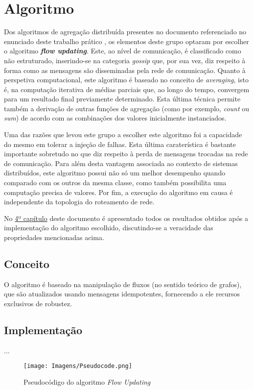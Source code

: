 \documentclass[a4paper]{article}
\begin{document}
\section{Algoritmo} \label{sec:Algorithm}
\large{
	Dos algoritmos de agregação distribuída presentes no documento referenciado no enunciado deste trabalho prático \parencite{article}, os elementos deste grupo optaram por escolher o algoritmo \textbf{\textit{flow updating}}.
	Este, ao nível de comunicação, é classificado como não estruturado, inserindo-se na categoria \textit{gossip} que, por sua vez, diz respeito à forma como as mensagens são disseminadas pela rede de comunicação.
	Quanto à perspetiva computacional, este algoritmo é baseado no conceito de \textit{averaging}, isto é, na computação iterativa de médias parciais que, ao longo do tempo, convergem para um resultado final previamente determinado.
	Esta última técnica permite também a derivação de outras funções de agregação (como por exemplo, \textit{count} ou \textit{sum}) de acordo com as combinações dos valores inicialmente instanciados.

	Uma das razões que levou este grupo a escolher este algoritmo foi a capacidade do mesmo em tolerar a injeção de falhas. Esta última caraterística é bastante importante sobretudo no que diz respeito à perda de mensagens trocadas na rede de comunicação.
	Para além desta vantagem associada ao contexto de sistemas distribuídos, este algoritmo possui não só um melhor desempenho quando comparado com os outros da mesma classe, como também possibilita uma computação precisa de valores.
	Por fim, a execução do algoritmo em causa é independente da topologia do roteamento de rede.

	No \hyperref[sec:Analysis of results]{4º capítulo} deste documento é apresentado todos os resultados obtidos após a implementação do algoritmo escolhido, discutindo-se a veracidade das propriedades mencionadas acima.

	\subsection{Conceito} \label{subsec:Concept}
	O algoritmo é baseado na manipulação de fluxos (no sentido teórico de grafos), que são atualizados usando mensagens idempotentes, fornecendo a ele recursos exclusivos de robustez.

	\subsection{Implementação} \label{subsec:Implementation}
	...

	\begin{figure}[H]
		\centering
		\texttt{[image: Imagens/Pseudocode.png]}
		\caption{Pseudocódigo do algoritmo \textit{Flow Updating}}
		\label{fig:1}
	\end{figure}
}
\end{document}

